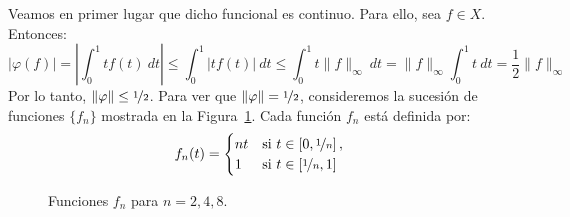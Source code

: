 \documentclass[12pt]{article}
\begin{document}
\begin{ejercicio}[1.5 puntos]
\begin{enumerate}[label=\alph*)]
            Veamos en primer lugar que dicho funcional es continuo. Para ello, sea $f\in X$. Entonces:
            \begin{equation*}
                |\varphi(f)| = \left|\int_0^1 tf(t)~dt\right| \leq \int_0^1 |tf(t)|~dt \leq \int_0^1 t\|f\|_\infty~dt = \|f\|_\infty \int_0^1 t~dt = \frac{1}{2}\|f\|_\infty
            \end{equation*}
            Por lo tanto, $\|\varphi\| \leq \nicefrac{1}{2}$. Para ver que $\|\varphi\| = \nicefrac{1}{2}$, consideremos la sucesión de funciones $\{f_n\}$ mostrada en la Figura~\ref{fig:funciones}. Cada función $f_n$ está definida por:
            \begin{equation*}
                f_n(t) = \begin{cases}
                    nt & \text{si } t\in \left[0, \nicefrac{1}{n}\right], \\
                    1 & \text{si } t\in \left[\nicefrac{1}{n}, 1\right]
                \end{cases}
            \end{equation*}
            \begin{figure}[h]
                \centering
                \caption{Funciones $f_n$ para $n=2,4,8$.}
                \label{fig:funciones}                
            \end{figure}


\end{enumerate}
\end{ejercicio}
\end{document}
